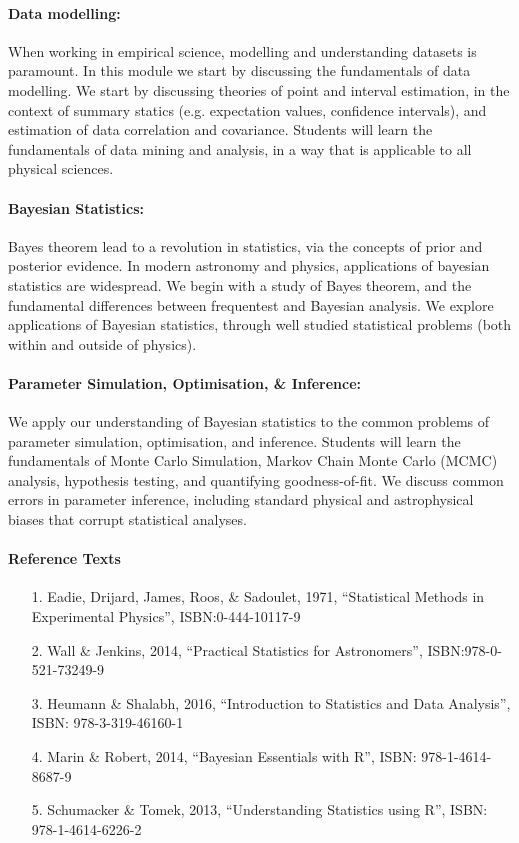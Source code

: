 \documentclass[useams,useamsmath,usenatbib]{mnras}
\begin{document}
\paragraph*{Data modelling: }
When working in empirical science, modelling and understanding datasets is paramount. In this module we start by
discussing the fundamentals of data modelling. We start by discussing theories of point and interval estimation, in the
context of summary statics (e.g. expectation values, confidence intervals), and estimation of data correlation and
covariance. Students will learn the fundamentals of data mining and analysis, in a way that is applicable to
all physical sciences.  
\paragraph*{Bayesian Statistics: }
Bayes theorem lead to a revolution in statistics, via the concepts of prior and posterior evidence. In modern astronomy
and physics, applications of bayesian statistics are widespread. We begin with a study of Bayes theorem, and the
fundamental differences between frequentest and Bayesian analysis. We explore applications of Bayesian statistics,
through well studied statistical problems (both within and outside of physics). 
\paragraph*{Parameter Simulation, Optimisation, \& Inference: }
We apply our understanding of Bayesian statistics to the common problems of parameter simulation, optimisation, and
inference. Students will learn the fundamentals of Monte Carlo Simulation, Markov Chain Monte Carlo (MCMC) analysis, hypothesis testing,
and quantifying goodness-of-fit. We discuss common errors in parameter inference, including standard physical and
astrophysical biases that corrupt statistical analyses. 

\paragraph*{Reference Texts}
\begin{enumerate}
\item[1.] Eadie, Drijard, James, Roos, \& Sadoulet, 1971, ``Statistical Methods in Experimental Physics'', ISBN:0-444-10117-9
\item[2.] Wall \& Jenkins, 2014, ``Practical Statistics for Astronomers'', ISBN:978-0-521-73249-9
\item[3.] Heumann \& Shalabh, 2016, ``Introduction to Statistics and Data Analysis'', ISBN: 978-3-319-46160-1
\item[4.] Marin \& Robert, 2014, ``Bayesian Essentials with R'', ISBN: 978-1-4614-8687-9
\item[5.] Schumacker \& Tomek, 2013, ``Understanding Statistics using R'', ISBN: 978-1-4614-6226-2
\end{enumerate}
\end{document}
